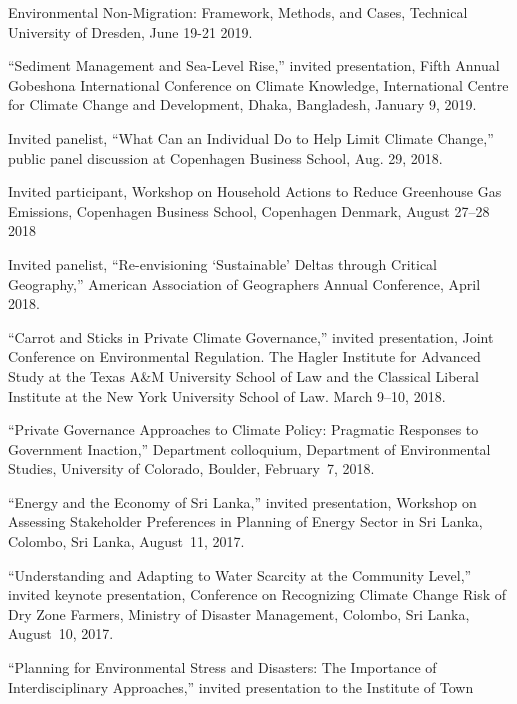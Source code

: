  Environmental Non-Migration: Framework, Methods, and Cases, Technical
 University of Dresden, June 19-21 2019.
\item ``Sediment Management and Sea-Level Rise,'' invited presentation, Fifth
  Annual Gobeshona International Conference on Climate Knowledge, International
  Centre for Climate Change and Development, Dhaka, Bangladesh, January 9, 2019.
\item Invited panelist, ``What Can an Individual Do to Help Limit Climate
  Change,'' public panel discussion at Copenhagen Business School, Aug. 29,
  2018.
\item Invited participant, Workshop on Household Actions to Reduce Greenhouse
  Gas Emissions, Copenhagen Business School, Copenhagen Denmark, August 27--28
  2018
\item Invited panelist, ``Re-envisioning `Sustainable' Deltas through Critical
  Geography,'' American Association of Geographers Annual Conference, April
  2018.
\item ``Carrot and Sticks in Private Climate Governance,'' invited
  presentation, Joint Conference on Environmental Regulation. The Hagler
  Institute for Advanced Study at the Texas A\&M University School of Law and
  the Classical Liberal Institute at the New York University School of Law.
  March 9--10, 2018.
\item ``Private Governance Approaches to Climate Policy: Pragmatic Responses to
  Government Inaction,'' Department colloquium, Department of Environmental
  Studies, University of Colorado, Boulder, February~7, 2018.
\item ``Energy and the Economy of Sri Lanka,'' invited presentation, Workshop
  on Assessing Stakeholder Preferences in Planning of Energy Sector in Sri
  Lanka, Colombo, Sri Lanka, August~11, 2017.
\item ``Understanding and Adapting to Water Scarcity at the Community Level,''
  invited keynote presentation, Conference on Recognizing Climate Change Risk
  of Dry Zone Farmers, Ministry of Disaster Management, Colombo, Sri Lanka,
  August~10, 2017.
\item ``Planning for Environmental Stress and Disasters: The Importance of
  Interdisciplinary Approaches,'' invited presentation to the Institute of Town
